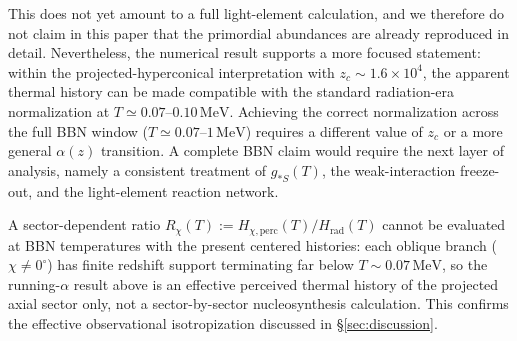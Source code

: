 \documentclass[preprint,12pt]{elsarticle}
\begin{document}
This does not yet amount to a full light-element calculation, and we therefore do not claim in this paper that the primordial abundances are already reproduced in detail. Nevertheless, the numerical result supports a more focused statement: within the projected-hyperconical interpretation with $z_c\sim1.6\times10^4$, the apparent thermal history can be made compatible with the standard radiation-era normalization at $T\simeq0.07$--$0.10\,\mathrm{MeV}$. Achieving the correct normalization across the full BBN window ($T\simeq0.07$--$1\,\mathrm{MeV}$) requires a different value of $z_c$ or a more general $\alpha(z)$ transition. A complete BBN claim would require the next layer of analysis, namely a consistent treatment of $g_{*S}(T)$, the weak-interaction freeze-out, and the light-element reaction network.

A sector-dependent ratio $R_\chi(T):=H_{\chi,\mathrm{perc}}(T)/H_{\mathrm{rad}}(T)$ cannot be evaluated at BBN temperatures with the present centered histories: each oblique branch ($\chi\neq0^\circ$) has finite redshift support terminating far below $T\sim0.07\,\mathrm{MeV}$, so the running-$\alpha$ result above is an effective perceived thermal history of the projected axial sector only, not a sector-by-sector nucleosynthesis calculation. This confirms the effective observational isotropization discussed in \S\ref{sec:discussion}.
\end{document}
